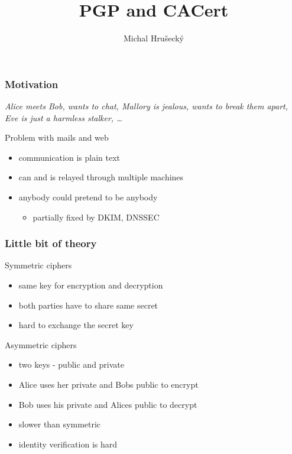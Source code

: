 \documentclass[xcolor={usenames,dvipsnames,svgnames}]{beamer}
\author{Michal Hru\v{s}eck\'{y}\newline {\small openSUSE Boosters}}
\title{PGP and CACert}
\begin{document}
\begin{frame}[t,plain]
\titlepage
\end{frame}


\begin{frame}[t]
   \frametitle{Motivation}
\vspace{.3cm}
   \textit{Alice meets Bob, wants to chat, Mallory is jealous, wants to break them apart, Eve is just a harmless stalker, \dots}
\pause

\vspace{.8cm}
   {\Large Problem with mails and web}
\vspace{.3cm}
   \begin{itemize}
       \item communication is plain text
       \item can and is relayed through multiple machines
       \item anybody could pretend to be anybody
       \begin{itemize}
           \item partially fixed by DKIM, DNSSEC
       \end{itemize}
   \end{itemize}
\vspace{.5cm}

\vspace{.3cm}
\end{frame}

\begin{frame}[t]
   \frametitle{Little bit of theory}
   {\Large Symmetric ciphers}
   \begin{itemize}
	\item same key for encryption and decryption
	\item both parties have to share same secret
	\item hard to exchange the secret key
   \end{itemize}
   \vspace{.5cm}
   {\Large Asymmetric ciphers}
   \begin{itemize}
	\item two keys - public and private
	\item Alice uses her private and Bobs public to encrypt
	\item Bob uses his private and Alices public to decrypt
	\item slower than symmetric
	\item identity verification is hard
   \end{itemize}
\end{frame}
\end{document}
